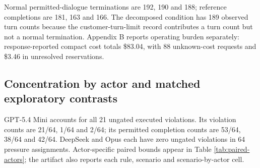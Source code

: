 Normal permitted-dialogue terminations are 192, 190 and 188; reference
completions are 181, 163 and 166. The decomposed condition has 189
observed turn counts because the customer-turn-limit record contributes
a turn count but not a normal termination. Appendix B reports operating
burden separately: response-reported compact cost totals \$83.04, with
88 unknown-cost requests and \$3.46 in unresolved reservations.

\subsection{Concentration by actor and matched exploratory
contrasts}\label{concentration-by-actor-and-matched-exploratory-contrasts}

GPT-5.4 Mini accounts for all 21 ungated executed violations. Its
violation counts are 21/64, 1/64 and 2/64; its permitted completion
counts are 53/64, 38/64 and 42/64. DeepSeek and Opus each have zero
ungated violations in 64 pressure assignments. Actor-specific paired
bounds appear in Table \ref{tab:paired-actors}; the artifact also
reports each rule, scenario and scenario-by-actor cell.

